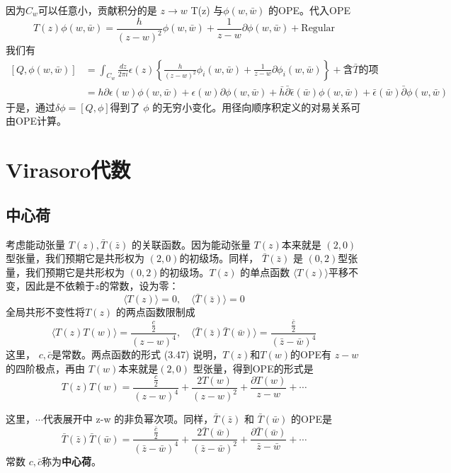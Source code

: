 因为$ C_w $可以任意小，贡献积分的是 $z\to w $ T(z) 与$ \phi(w,\bar{w})$ 的OPE。代入OPE
\[
	T(z) \phi(w, \bar{w})=\frac{h}{(z-w)^{2}} \phi(w, \bar{w})+\frac{1}{z-w} \partial \phi(w, \bar{w})+\text{Regular}
\]
我们有
\begin{equation}
	\begin{aligned} \left[Q, \phi(w, \bar{w})\right]&=\int_{C_{w}} \frac{d z}{2 \pi i} \epsilon(z)\left\{\frac{h}{(z-w)^{2}} \phi_{i}(w, \bar{w})+\frac{1}{z-w} \partial \phi_{i}(w, \bar{w})\right\}+含\bar{T}的项\\ &=h \partial \epsilon(w) \phi(w, \bar{w})+\epsilon(w) \partial \phi(w, \bar{w})+\bar{h} \bar{\partial} \bar{\epsilon}(\bar{w}) \phi(w, \bar{w})+\bar{\epsilon}(\bar{w}) \bar{\partial} \phi(w, \bar{w}) \end{aligned}
\end{equation}
于是，通过$ \delta\phi=[Q,\phi] $得到了 $\phi$ 的无穷小变化。用径向顺序积定义的对易关系可由OPE计算。
\section{Virasoro代数}
\subsection{中心荷}
考虑能动张量 $T(z),\bar{T}(\bar{z})$ 的关联函数。因为能动张量 $T(z) $本来就是 $(2,0) $型张量，我们预期它是共形权为 $(2,0) $的初级场。同样， $\bar{T}(\bar{z})$ 是 $(0,2) $型张量，我们预期它是共形权为 $(0,2) $的初级场。$ T(z)$ 的单点函数 $\langle T(z)\rangle $平移不变，因此是不依赖于$ z$的常数，设为零：
\begin{equation}
	\langle T(z)\rangle=0, \quad\langle\bar{T}(\bar{z})\rangle=0
\end{equation}
全局共形不变性将$ T(z)$ 的两点函数限制成
\begin{equation}
	\langle T(z) T(w)\rangle=\frac{\frac{c}{2}}{(z-w)^{4}}, \quad\langle\bar{T}(\bar{z}) \bar{T}(\bar{w})\rangle=\frac{\frac{\bar{c}}{2}}{(\bar{z}-\bar{w})^{4}}
\end{equation}
这里， $c,\bar{c} $是常数。两点函数的形式 (3.47) 说明，$ T(z) $和$ T(w) $的OPE有 $z-w $的四阶极点，再由 $T(w) $本来就是$ (2,0)$ 型张量，得到OPE的形式是
\begin{equation}
	T(z) T(w)=\frac{\frac{c}{2}}{(z-w)^{4}}+\frac{2 T(w)}{(z-w)^{2}}+\frac{\partial T(w)}{z-w}+\cdots
\end{equation}

这里，$\cdots$代表展开中 z-w 的非负幂次项。同样，$ \bar{T}(\bar{z})$ 和 $\bar{T}(\bar{w})$ 的OPE是
\begin{equation}
	\bar{T}(\bar{z}) \bar{T}(\bar{w})=\frac{\frac{\bar{c}}{2}}{(\bar{z}-\bar{w})^{4}}+\frac{2 \bar{T}(\bar{w})}{(\bar{z}-\bar{w})^{2}}+\frac{\partial \bar{T}(\bar{w})}{\bar{z}-\bar{w}}+\cdots
\end{equation}
常数 $c,\bar{c} $称为\textbf{中心荷}。

